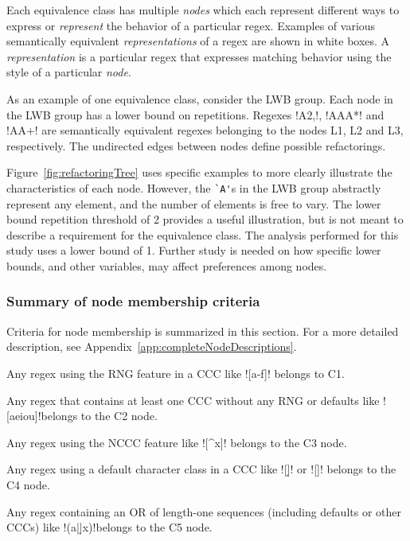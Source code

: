 Each equivalence class has multiple \emph{nodes} which each represent different ways to express or \emph{represent} the behavior of a particular regex.  Examples of various semantically equivalent \emph{representations} of a regex are shown in white boxes. A \emph{representation} is a particular regex that expresses matching behavior using the style of a particular \emph{node}.

As an example of one equivalence class, consider the LWB group.  Each node in the LWB group has a lower bound on repetitions. Regexes \cverb!A{2,}!, \cverb!AAA*! and \cverb!AA+! are semantically equivalent regexes belonging to the nodes L1, L2 and L3, respectively.
The undirected edges between nodes define possible refactorings.

Figure~\ref{fig:refactoringTree} uses specific examples to more clearly illustrate the characteristics of each node.  However, the \verb!`A'!s in the LWB group abstractly represent any element, and the number of elements is free to vary. The lower bound repetition threshold of 2 provides a useful illustration, but is not meant to describe a requirement for the equivalence class.  The analysis performed for this study uses a lower bound of 1.  Further study is needed on how specific lower bounds, and other variables, may affect preferences among nodes.

\subsubsection{Summary of node membership criteria}
Criteria for node membership is summarized in this section.  For a more detailed description, see Appendix~\ref{app:completeNodeDescriptions}.

\begin{description}  \itemsep -1pt
\item[C1:] Any regex using the RNG feature in a CCC like \cverb![a-f]! belongs to C1.
\item[C2:] Any regex that contains at least one CCC without any RNG or defaults like \cverb![aeiou]!belongs to the C2 node.
\item[C3:] Any regex using the NCCC feature like \cverb![^x]! belongs to the C3 node.
\item[C4:] Any regex using a default character class in a CCC like \cverb![\d]! or \cverb![\W]! belongs to the C4 node.
\item[C5:] Any regex containing an OR of length-one sequences (including defaults or other CCCs) like \cverb!(a|\d|x)!belongs to the C5 node.
\end{description}

